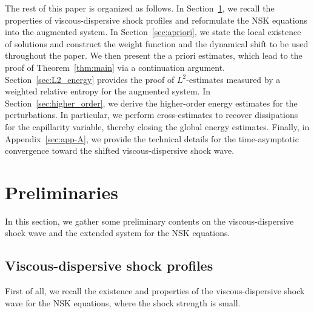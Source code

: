 \documentclass[11pt,reqno]{amsart}
\numberwithin{equation}{section} %
\begin{document}
The rest of this paper is organized as follows. In Section~\ref{sec:prelim}, we recall the properties of viscous-dispersive shock profiles and reformulate the NSK equations into the augmented system. In Section~\ref{sec:apriori}, we state the local existence of solutions and construct the weight function and the dynamical shift to be used throughout the paper. We then present the a priori estimates, which lead to the proof of Theorem~\ref{thm:main} via a continuation argument. Section~\ref{sec:L2_energy} provides the proof of $L^2$-estimates measured by a weighted relative entropy for the augmented system. %
In Section~\ref{sec:higher_order}, we derive the higher-order energy estimates for the perturbations. In particular, we perform cross-estimates to recover dissipations for the capillarity variable, thereby closing the global energy estimates. Finally, in Appendix~\ref{sec:app-A}, we provide the technical details for the time-asymptotic convergence toward the shifted viscous-dispersive shock wave.



\section{Preliminaries}\label{sec:prelim}
\setcounter{equation}{0}
In this section, we gather some preliminary contents on the viscous-dispersive shock wave and the extended system for the NSK equations.

\subsection{Viscous-dispersive shock profiles}
First of all, we recall the existence and properties of the viscous-dispersive shock wave for the NSK equations, where the shock strength is small.
\end{document}

